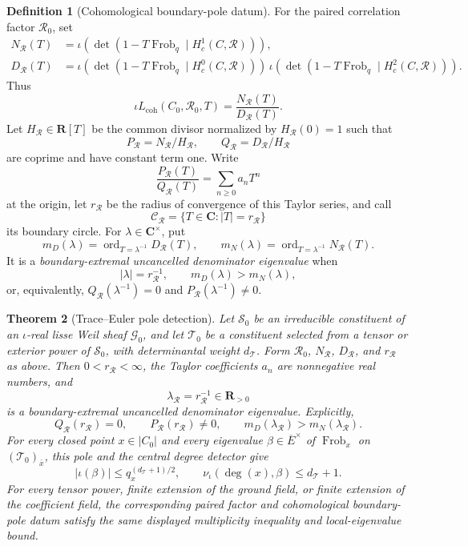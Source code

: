 \documentclass[10pt]{article}
\newtheorem{theorem}{Theorem}[section]
\theoremstyle{definition}
\newtheorem{definition}[theorem]{Definition}
\newcommand{\Frob}{\operatorname{Frob}}
\begin{document}
\begin{definition}[Cohomological boundary-pole datum]
For the paired correlation factor \(\mathcal R_0\), set
\[
 \begin{aligned}
 N_{\mathcal R}(T)
   &=\iota\!\left(\det(1-T\Frob_q\mid H_c^1(C,\mathcal R))\right),\\
 D_{\mathcal R}(T)
   &=\iota\!\left(\det(1-T\Frob_q\mid H_c^0(C,\mathcal R))\right)
     \,\iota\!\left(\det(1-T\Frob_q\mid H_c^2(C,\mathcal R))\right).
 \end{aligned}
\]
Thus
\[
 \iota L_{\mathrm{coh}}(C_0,\mathcal R_0,T)
       =\frac{N_{\mathcal R}(T)}{D_{\mathcal R}(T)}.
\]
Let \(H_{\mathcal R}\in\mathbf R[T]\) be the common divisor normalized by
\(H_{\mathcal R}(0)=1\) such that
\[
 P_{\mathcal R}=N_{\mathcal R}/H_{\mathcal R},\qquad
 Q_{\mathcal R}=D_{\mathcal R}/H_{\mathcal R}
\]
are coprime and have constant term one.  Write
\[
 \frac{P_{\mathcal R}(T)}{Q_{\mathcal R}(T)}
      =\sum_{n\ge0}a_nT^n
\]
at the origin, let \(r_{\mathcal R}\) be the radius of convergence of this
Taylor series, and call
\[
             \mathcal C_{\mathcal R}
             =\{T\in\mathbf C:|T|=r_{\mathcal R}\}
\]
its boundary circle.  For \(\lambda\in\mathbf C^\times\), put
\[
 m_D(\lambda)=\operatorname{ord}_{T=\lambda^{-1}}D_{\mathcal R}(T),
 \qquad
 m_N(\lambda)=\operatorname{ord}_{T=\lambda^{-1}}N_{\mathcal R}(T).
\]
It is a \emph{boundary-extremal uncancelled denominator eigenvalue} when
\[
 |\lambda|=r_{\mathcal R}^{-1},\qquad
 m_D(\lambda)>m_N(\lambda),
\]
or, equivalently,
\(Q_{\mathcal R}(\lambda^{-1})=0\) and
\(P_{\mathcal R}(\lambda^{-1})\ne0\).
\end{definition}

\begin{theorem}[Trace--Euler pole detection]
Let \(\mathcal S_0\) be an irreducible constituent of an \(\iota\)-real
lisse Weil sheaf \(\mathcal G_0\), and let \(\mathcal T_0\) be a constituent
selected from a tensor or exterior power of \(\mathcal S_0\), with
determinantal weight \(d_{\mathcal T}\).  Form \(\mathcal R_0\),
\(N_{\mathcal R}\), \(D_{\mathcal R}\), and \(r_{\mathcal R}\) as above.
Then \(0<r_{\mathcal R}<\infty\), the Taylor coefficients \(a_n\) are
nonnegative real numbers, and
\[
 \lambda_{\mathcal R}=r_{\mathcal R}^{-1}\in\mathbf R_{>0}
\]
is a boundary-extremal uncancelled denominator eigenvalue.  Explicitly,
\[
 Q_{\mathcal R}(r_{\mathcal R})=0,\qquad
 P_{\mathcal R}(r_{\mathcal R})\ne0,\qquad
 m_D(\lambda_{\mathcal R})>m_N(\lambda_{\mathcal R}).
\]
For every closed point \(x\in|C_0|\) and every eigenvalue
\(\beta\in\overline E^\times\) of \(\Frob_x\) on
\((\mathcal T_0)_{\bar x}\), this pole and the central degree detector give
\[
 |\iota(\beta)|\le q_x^{(d_{\mathcal T}+1)/2},
 \qquad
 \nu_\iota(\deg(x),\beta)\le d_{\mathcal T}+1.
\]
For every tensor power, finite extension of the ground field, or finite
extension of the coefficient field, the corresponding paired factor and
cohomological boundary-pole datum satisfy the same displayed multiplicity
inequality and local-eigenvalue bound.
\end{theorem}
\end{document}
